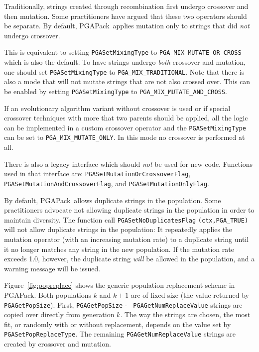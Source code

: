 \documentclass{report}
\newcommand{\pga}{PGAPack}
\begin{document}
Traditionally, strings created through recombination first undergo crossover
and then mutation.  Some practitioners \cite{Da91} have argued that these two
operators should be separate.  By default, \pga\ applies mutation only to
strings that did {\em not} undergo crossover.

\begin{sloppypar}
This is equivalent to setting \verb+PGASetMixingType+ to
\verb+PGA_MIX_MUTATE_OR_CROSS+ which is also the default.
To have strings undergo {\em both} crossover and mutation, one should
set \verb+PGASetMixingType+ to \verb+PGA_MIX_TRADITIONAL+. Note that
there is also a mode that will not mutate strings that are not also
crossed over. This can be enabled by setting \verb+PGASetMixingType+ to
\verb+PGA_MIX_MUTATE_AND_CROSS+.
\end{sloppypar}

If an evolutionary algorithm variant without crossover is used or if
special crossover techniques with more that two parents should be
applied, all the logic can be implemented in a custom crossover operator
and the \verb+PGASetMixingType+ can be set to \verb+PGA_MIX_MUTATE_ONLY+.
In this mode no crossover is performed at all.

There is also a legacy interface which should \textit{not} be used for
new code. Functions used in that interface are:
\verb+PGASetMutationOrCrossoverFlag+,
\verb+PGASetMutationAndCrossoverFlag+, and
\verb+PGASetMutationOnlyFlag+.

By default, \pga\ allows duplicate strings in the population.  Some
practitioners advocate not allowing duplicate strings in the population in
order to maintain diversity.  The function call {\tt PGASetNoDuplicatesFlag}
{\tt (ctx,PGA\_TRUE)} will not allow duplicate strings in the population: It
repeatedly applies the mutation operator (with an increasing mutation rate) to
a duplicate string until it no longer matches any string in the new
population.  If the mutation rate exceeds 1.0, however, the duplicate string
{\em will} be allowed in the population, and a warning message will be issued.

Figure~\ref{fig:popreplace} shows the generic population replacement scheme in
\pga.  Both populations $k$ and $k+1$  are of fixed size (the value returned by
{\tt PGAGetPopSize}).  First, {\tt PGAGetPopSize} - {\tt
PGAGetNumReplaceValue} strings are copied over directly from generation $k$.
The way the strings are chosen, the most fit, or randomly with or without
replacement, depends on the value set by {\tt PGASetPopReplaceType}.  The
remaining {\tt PGAGetNumReplaceValue} strings are created by crossover and
mutation.
\end{document}
